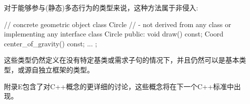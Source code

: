 对于能够参与(静态)多态行为的类型来说，这种方法属于非侵入:

\begin{cpp}
// concrete geometric object class Circle
// - not derived from any class or implementing any interface
class Circle {
	public:
	void draw() const;
	Coord center_of_gravity() const;
	...
};
\end{cpp}

这些类型仍然定义在没有特定基类或需求子句的情况下，并且仍然可以是基本类型，或源自独立框架的类型。

附录E包含了对C++概念的更详细的讨论，这些概念将在下一个C++标准中出现。



















